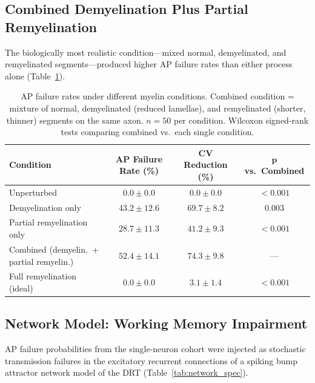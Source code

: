 \documentclass[11pt]{article}
\begin{document}
\subsection{Combined Demyelination Plus Partial Remyelination}

The biologically most realistic condition---mixed normal, demyelinated, and remyelinated segments---produced higher AP failure rates than either process alone (Table~\ref{tab:combined}).

\begin{table}[H]
\centering
\caption{AP failure rates under different myelin conditions. Combined condition = mixture of normal, demyelinated (reduced lamellae), and remyelinated (shorter, thinner) segments on the same axon. $n = 50$ per condition. Wilcoxon signed-rank tests comparing combined vs.\ each single condition.}
\label{tab:combined}
\begin{tabular}{lccc}
\toprule
\textbf{Condition} & \textbf{AP Failure Rate (\%)} & \textbf{CV Reduction (\%)} & $\boldsymbol{p}$ \textbf{vs.\ Combined} \\
\midrule
Unperturbed & $0.0 \pm 0.0$ & $0.0 \pm 0.0$ & $< 0.001$ \\
Demyelination only & $43.2 \pm 12.6$ & $69.7 \pm 8.2$ & 0.003 \\
Partial remyelination only & $28.7 \pm 11.3$ & $41.2 \pm 9.3$ & $< 0.001$ \\
Combined (demyelin.\ + partial remyelin.) & $\mathbf{52.4 \pm 14.1}$ & $\mathbf{74.3 \pm 9.8}$ & --- \\
Full remyelination (ideal) & $0.0 \pm 0.0$ & $3.1 \pm 1.4$ & $< 0.001$ \\
\bottomrule
\end{tabular}
\end{table}

\subsection{Network Model: Working Memory Impairment}

AP failure probabilities from the single-neuron cohort were injected as stochastic transmission failures in the excitatory recurrent connections of a spiking bump attractor network model of the DRT (Table~\ref{tab:network_spec}).
\end{document}
